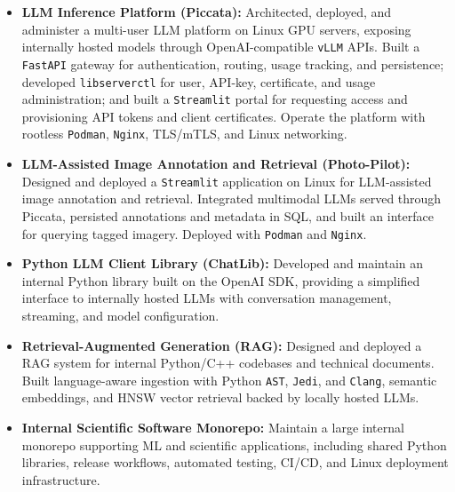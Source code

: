 \documentclass[11pt]{article}
\begin{document}
\begin{itemize}[leftmargin=*,nosep]

    \item \textbf{LLM Inference Platform (Piccata):}
    Architected, deployed, and administer a multi-user LLM platform on Linux
    GPU servers, exposing internally hosted models through OpenAI-compatible
    \texttt{vLLM} APIs. Built a \texttt{FastAPI} gateway for authentication,
    routing, usage tracking, and persistence; developed \texttt{libserverctl}
    for user, API-key, certificate, and usage administration; and built a
    \texttt{Streamlit} portal for requesting access and provisioning API tokens
    and client certificates. Operate the platform with rootless \texttt{Podman},
    \texttt{Nginx}, TLS/mTLS, and Linux networking.

    \item \textbf{LLM-Assisted Image Annotation and Retrieval (Photo-Pilot):}
    Designed and deployed a \texttt{Streamlit} application on Linux for
    LLM-assisted image annotation and retrieval. Integrated multimodal LLMs
    served through Piccata, persisted annotations and metadata in SQL, and
    built an interface for querying tagged imagery. Deployed with
    \texttt{Podman} and \texttt{Nginx}.

    \item \textbf{Python LLM Client Library (ChatLib):}
    Developed and maintain an internal Python library built on the OpenAI SDK,
    providing a simplified interface to internally hosted LLMs with conversation
    management, streaming, and model configuration.

    \item \textbf{Retrieval-Augmented Generation (RAG):}
    Designed and deployed a RAG system for internal Python/C++ codebases and
    technical documents. Built language-aware ingestion with Python
    \texttt{AST}, \texttt{Jedi}, and \texttt{Clang}, semantic embeddings, and
    HNSW vector retrieval backed by locally hosted LLMs.

    \item \textbf{Internal Scientific Software Monorepo:}
    Maintain a large internal monorepo supporting ML and scientific applications,
    including shared Python libraries, release workflows, automated testing,
    CI/CD, and Linux deployment infrastructure.

\end{itemize}

\end{document}
